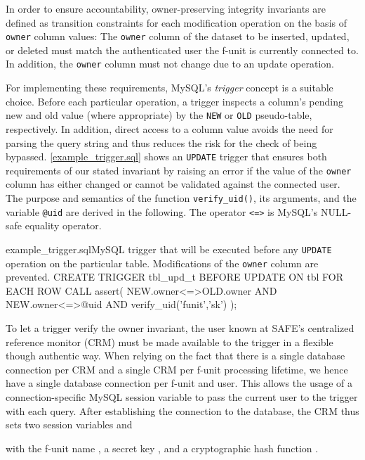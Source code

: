 \documentclass{src/acm_proc_article-sp} \else
\newcommand\SAFE{SAFE\xspace}
\begin{document}
In order to ensure accountability, owner-preserving integrity
invariants are defined as transition constraints for each
modification operation on the basis of \texttt{owner} column values:
The \texttt{owner} column of the dataset to be inserted, updated, or
deleted must match the authenticated user the f-unit is currently
connected to. In addition, the \texttt{owner} column must not change
due to an update operation.

For implementing these requirements, MySQL's \emph{trigger} concept
\cite{mysql-create-trigger} is a suitable choice. Before each
particular operation, a trigger inspects a column's pending new and
old value (where appropriate) by the \texttt{NEW} or \texttt{OLD}
pseudo-table, respectively. In addition, direct access to a column
value avoids the need for parsing the query string and thus reduces
the risk for the check of being bypassed.
\autoref{example_trigger.sql} shows an \texttt{UPDATE} trigger that
ensures both requirements of our stated invariant by raising an error
if the value of the \texttt{owner} column has either changed or
cannot be validated against the connected user. The purpose and
semantics of the function \texttt{verify\_uid()}, its arguments, and
the variable \texttt{@uid} are derived in the following. 
The operator \texttt{<=>} is MySQL's NULL-safe equality operator.
\begin{lstfloat}{example_trigger.sql}{MySQL trigger that will be executed before any \texttt{UPDATE} operation on the particular table. Modifications of the \texttt{owner} column are prevented.}
  CREATE TRIGGER tbl_upd_t BEFORE UPDATE ON tbl
    FOR EACH ROW CALL assert(
      NEW.owner<=>OLD.owner AND NEW.owner<=>@uid AND verify_uid('funit','sk')
    );
\end{lstfloat}

To let a trigger verify the owner invariant, the user  known at
\SAFE's centralized reference monitor (CRM) must be made available to
the trigger in a flexible though authentic way. When relying on the
fact that there is a single database connection per CRM and a single
CRM per f-unit processing lifetime, we hence have a single database
connection per f-unit and user. This allows the usage of a
connection-specific MySQL session variable
\cite{mysql-user-variables} to pass the current user  to the
trigger with each query. After establishing the connection to the
database, the CRM thus sets two session variables
 and

with the f-unit name , a secret key , and a
cryptographic hash function .
  
\end{document}
